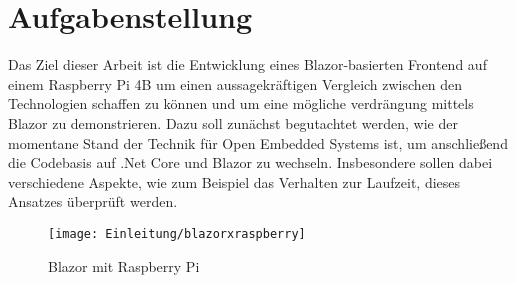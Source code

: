 \section{Aufgabenstellung}
\label{sec:aufgabenstellung}
Das Ziel dieser Arbeit ist die Entwicklung eines Blazor-basierten Frontend auf einem Raspberry Pi
4B um einen aussagekräftigen Vergleich zwischen den Technologien schaffen zu können und um eine
mögliche verdrängung mittels Blazor zu demonstrieren. Dazu soll
zunächst begutachtet werden, wie der momentane Stand der Technik für Open Embedded Systems ist,
um anschließend die Codebasis auf .Net Core und Blazor zu wechseln. Insbesondere sollen dabei
verschiedene Aspekte, wie zum Beispiel das Verhalten zur Laufzeit, dieses Ansatzes überprüft werden.
\begin{figure}[h]
    \centering
    \texttt{[image: Einleitung/blazorxraspberry]}
    \caption[Blazor mit Raspberry Pi]{Blazor mit Raspberry Pi}
    \label{img:blazorxraspberry}
\end{figure}